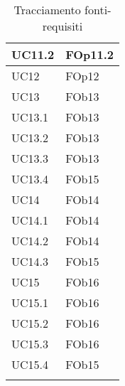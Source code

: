 \begin{longtable}{|l|p{4cm}|}
\hline
		UC11.2 & FOp11.2 \linebreak   \\
\hline
		UC12 & FOp12 \linebreak   \\
\hline
		UC13 & FOb13 \linebreak   \\
\hline
		UC13.1 & FOb13 \linebreak   \\
\hline
		UC13.2 & FOb13 \linebreak   \\
\hline
		UC13.3 & FOb13 \linebreak   \\
\hline
		UC13.4 & FOb15 \linebreak   \\
\hline
		UC14 & FOb14 \linebreak   \\
\hline
		UC14.1 & FOb14 \linebreak   \\
\hline
		UC14.2 & FOb14 \linebreak   \\
\hline
		UC14.3 & FOb15 \linebreak   \\
\hline
		UC15 & FOb16 \linebreak   \\
\hline
		UC15.1 & FOb16 \linebreak   \\
\hline
		UC15.2 & FOb16 \linebreak   \\
\hline
		UC15.3 & FOb16 \linebreak   \\
\hline
		UC15.4 & FOb15 \linebreak   \\
\hline
\caption{Tracciamento fonti-requisiti}
\end{longtable}